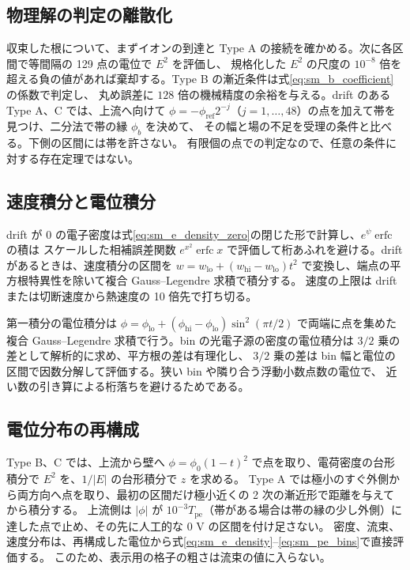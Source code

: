 

\subsection{物理解の判定の離散化}
収束した根について、まずイオンの到達と Type A の接続を確かめる。次に各区間で等間隔の 129 点の電位で $E^2$ を評価し、
規格化した $E^2$ の尺度の $10^{-8}$ 倍を超える負の値があれば棄却する。Type B の漸近条件は式\eqref{eq:sm_b_coefficient}の係数で判定し、
丸め誤差に $128$ 倍の機械精度の余裕を与える。drift のある Type A、C では、上流へ向けて
$\phi=-\phi_{\mathrm{ref}}2^{-j}$（$j=1,\dots,48$）の点を加えて帯を見つけ、二分法で帯の縁 $\phi_b$ を決めて、
その幅と場の不足を受理の条件と比べる。下側の区間には帯を許さない。
有限個の点での判定なので、任意の条件に対する存在定理ではない。

\subsection{速度積分と電位積分}
drift が 0 の電子密度は式\eqref{eq:sm_e_density_zero}の閉じた形で計算し、$e^{\psi}\operatorname{erfc}$ の積は
スケールした相補誤差関数 $e^{x^2}\operatorname{erfc}x$ で評価して桁あふれを避ける。drift があるときは、速度積分の区間を
$w=w_{\mathrm{lo}}+(w_{\mathrm{hi}}-w_{\mathrm{lo}})t^2$ で変換し、端点の平方根特異性を除いて複合 Gauss--Legendre 求積で積分する。
速度の上限は drift または切断速度から熱速度の 10 倍先で打ち切る。

第一積分の電位積分は $\phi=\phi_{\mathrm{lo}}+(\phi_{\mathrm{hi}}-\phi_{\mathrm{lo}})\sin^2(\pi t/2)$ で両端に点を集めた
複合 Gauss--Legendre 求積で行う。bin の光電子源の密度の電位積分は $3/2$ 乗の差として解析的に求め、平方根の差は有理化し、
$3/2$ 乗の差は bin 幅と電位の区間で因数分解して評価する。狭い bin や隣り合う浮動小数点数の電位で、
近い数の引き算による桁落ちを避けるためである。

\subsection{電位分布の再構成}
Type B、C では、上流から壁へ $\phi=\phi_0(1-t)^2$ で点を取り、電荷密度の台形積分で $E^2$ を、$1/|E|$ の台形積分で $z$ を求める。
Type A では極小のすぐ外側から両方向へ点を取り、最初の区間だけ極小近くの 2 次の漸近形で距離を与えてから積分する。
上流側は $|\phi|$ が $10^{-3}T_{\mathrm{pe}}$（帯がある場合は帯の縁の少し外側）に達した点で止め、その先に人工的な 0 V の区間を付け足さない。
密度、流束、速度分布は、再構成した電位から式\eqref{eq:sm_e_density}--\eqref{eq:sm_pe_bins}で直接評価する。
このため、表示用の格子の粗さは流束の値に入らない。

